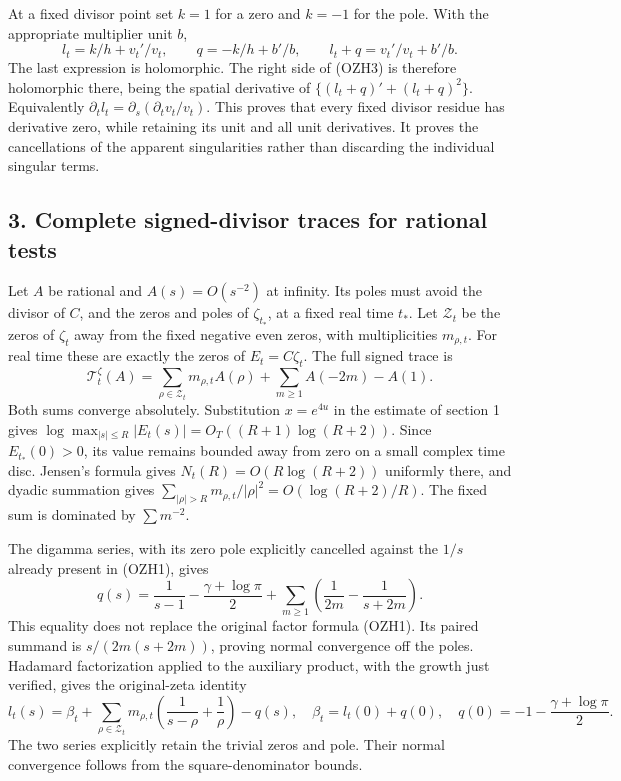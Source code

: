 \documentclass[
  10pt,
  a4paper,
]{article}
\begin{document}
At a fixed divisor point set \(k=1\) for a zero and \(k=-1\) for the
pole. With the appropriate multiplier unit \(b\), \[
l_t=k/h+v_t'/v_t,\qquad
q=-k/h+b'/b,\qquad
l_t+q=v_t'/v_t+b'/b.
\tag{OZH8}
\] The last expression is holomorphic. The right side of (OZH3) is
therefore holomorphic there, being the spatial derivative of
\(\{(l_t+q)'+(l_t+q)^2\}\). Equivalently
\(\partial_t l_t=\partial_s(\partial_t v_t/v_t)\). This proves that
every fixed divisor residue has derivative zero, while retaining its
unit and all unit derivatives. It proves the cancellations of the
apparent singularities rather than discarding the individual singular
terms.

\subsection{3. Complete signed-divisor traces for rational
tests}\label{complete-signed-divisor-traces-for-rational-tests}

Let \(A\) be rational and \(A(s)=O(s^{-2})\) at infinity. Its poles must
avoid the divisor of \(C\), and the zeros and poles of \(\zeta_{t_*}\),
at a fixed real time \(t_*\). Let \(\mathcal Z_t\) be the zeros of
\(\zeta_t\) away from the fixed negative even zeros, with multiplicities
\(m_{\rho,t}\). For real time these are exactly the zeros of
\(E_t=C\zeta_t\). The full signed trace is \[
\mathcal T_t^\zeta(A)=
\sum_{\rho\in\mathcal Z_t}m_{\rho,t}A(\rho)
+\sum_{m\ge1}A(-2m)-A(1).
\tag{OZH9}
\] Both sums converge absolutely. Substitution \(x=e^{4u}\) in the
estimate of section 1 gives
\(\log\max_{|s|\le R}|E_t(s)|=O_T((R+1)\log(R+2))\). Since
\(E_{t_*}(0)>0\), its value remains bounded away from zero on a small
complex time disc. Jensen's formula gives \(N_t(R)=O(R\log(R+2))\)
uniformly there, and dyadic summation gives
\(\sum_{|\rho|>R}m_{\rho,t}/|\rho|^2=O(\log(R+2)/R)\). The fixed sum is
dominated by \(\sum m^{-2}\).

The digamma series, with its zero pole explicitly cancelled against the
\(1/s\) already present in (OZH1), gives \[
q(s)=\frac1{s-1}-\frac{\gamma+\log\pi}{2}
+\sum_{m\ge1}\left(\frac1{2m}-\frac1{s+2m}\right).
\tag{OZH10}
\] This equality does not replace the original factor formula (OZH1).
Its paired summand is \(s/(2m(s+2m))\), proving normal convergence off
the poles. Hadamard factorization applied to the auxiliary product, with
the growth just verified, gives the original-zeta identity \[
l_t(s)=\beta_t+
\sum_{\rho\in\mathcal Z_t}m_{\rho,t}
\left(\frac1{s-\rho}+\frac1\rho\right)-q(s),\quad
\beta_t=l_t(0)+q(0),\quad
q(0)=-1-\frac{\gamma+\log\pi}{2}.
\tag{OZH11}
\] The two series explicitly retain the trivial zeros and pole. Their
normal convergence follows from the square-denominator bounds.
\end{document}
